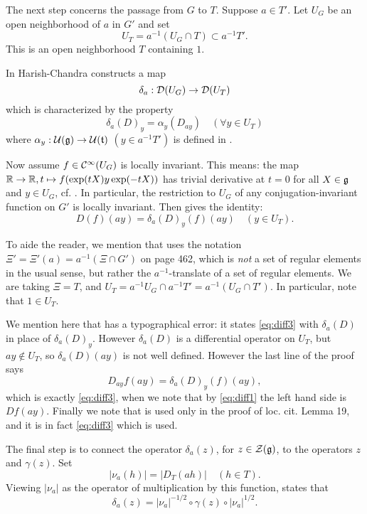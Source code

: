 \documentclass{article}
\theoremstyle{definition}
\numberwithin{equation}{section}
\renewcommand{\-}{\hyp{}}
\begin{document}
The next step concerns the passage from $G$ to $T$. Suppose $a\in T'$. 
Let $U_G$ be an open neighborhood of $a$ in $G'$ and set
\[
\label{e:UT}
U_T = a^{-1}(U_G\cap T)\subset a^{-1}T'.
\]
This is an open neighborhood $T$ containing $1$.


 In \cite[\S 5]{HC_inv_eigen} Harish-Chandra constructs a map
\[ \delta_a : \mathcal{D}(U_G) \to \mathcal{D}(U_T)\]
which is characterized by the property 
\[  \delta_a(D)_y = \alpha_y(D_{ay}) \quad (\forall y \in U_T) \]
where $\alpha_y : \mathcal{U}(\mathfrak{g}) \to \mathcal{U}(\mathfrak{t})$ $(y\in a^{-1}T')$ is defined  in \cite[\S5, Corollary 1, page 463]{HC_inv_eigen}.


Now assume $f \in \mathcal{C}^\infty(U_G)$  is locally invariant. This means: the map $\mathbb{R} \to \mathbb{R}, t \mapsto f(\exp(tX)y\exp(-tX))$ has trivial derivative at $t=0$  for all $X \in \mathfrak{g}$ and $y \in U_G$, cf. \cite[\S8]{HC_inv_dist}. In particular, the restriction to $U_G$ of any conjugation-invariant function on $G'$ is locally invariant.
Then 
\cite[Lemma 18]{HC_inv_eigen} gives the identity:
\begin{equation} \label{eq:diff3}
	D(f)(ay) = \delta_a(D)_y(f)(ay)\quad(y\in U_T).
\end{equation}

To aide the reader, we mention that \cite[Lemma 18]{HC_inv_eigen} uses the notation $\Xi'=\Xi'(a)=a^{-1}(\Xi\cap G')$ on page 462, which is \emph{not} a set of regular elements in the usual sense, but rather the $a^{-1}$-translate of a set of regular elements. We are taking $\Xi=T$, and $U_T=a^{-1}U_G \cap a^{-1}T'=a^{-1}(U_G\cap T')$. In particular, note that $1 \in U_T$.


We mention here that  \cite[Lemma 18]{HC_inv_eigen} has a typographical error: it states \eqref{eq:diff3} with $\delta_a(D)$ in place of
$\delta_a(D)_y$.  However $\delta_a(D)$ is a differential operator on $U_T$, but $ay\not\in U_T$, so $\delta_a(D)(ay)$ is not well defined.
However the last line of the proof  says
\[ D_{ay}f(ay) = \delta_a(D)_y(f)(ay), \]
which is exactly \eqref{eq:diff3}, when we note that by \eqref{eq:diff1}  the left hand side is $Df(ay)$.
Finally we note that \cite[Lemma 18]{HC_inv_eigen} is used only in the proof of loc. cit. Lemma 19, and it is in fact \eqref{eq:diff3} which is used.



The final step is to connect the operator $\delta_a(z)$, for $z \in \mathcal{Z}(\mathfrak{g})$, to the operators $z$ and $\gamma(z)$.
Set 
\[
|\nu_a(h)| = |D_T(ah)|\quad(h\in T).
\]
Viewing $|\nu_a|$ as the operator of multiplication by this function, 
\cite[\S6, Lemma 13]{HC_inv_eigen} states that
\begin{equation} \label{eq:diff2}
\delta_a(z) = |\nu_a|^{-1/2} \circ \gamma(z) \circ |\nu_a|^{1/2}.
\end{equation}
\end{document}
